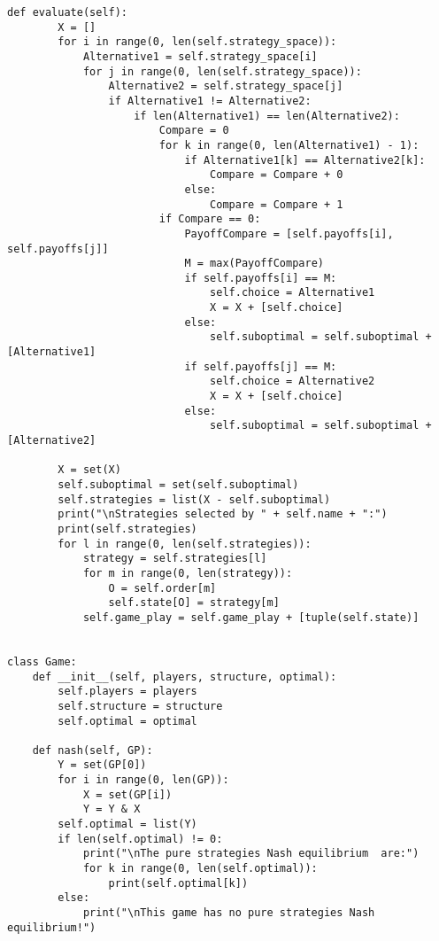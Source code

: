 \begin{itemize}
\begin{lstlisting}[style=fsharpstyle]
    def evaluate(self):
        X = []
        for i in range(0, len(self.strategy_space)):
            Alternative1 = self.strategy_space[i]
            for j in range(0, len(self.strategy_space)):
                Alternative2 = self.strategy_space[j]
                if Alternative1 != Alternative2:
                    if len(Alternative1) == len(Alternative2):
                        Compare = 0
                        for k in range(0, len(Alternative1) - 1):
                            if Alternative1[k] == Alternative2[k]:
                                Compare = Compare + 0
                            else:
                                Compare = Compare + 1
                        if Compare == 0:
                            PayoffCompare = [self.payoffs[i], self.payoffs[j]]
                            M = max(PayoffCompare)
                            if self.payoffs[i] == M:
                                self.choice = Alternative1
                                X = X + [self.choice]
                            else:
                                self.suboptimal = self.suboptimal + [Alternative1]
                            if self.payoffs[j] == M:
                                self.choice = Alternative2
                                X = X + [self.choice]
                            else:
                                self.suboptimal = self.suboptimal + [Alternative2]

        X = set(X)
        self.suboptimal = set(self.suboptimal)
        self.strategies = list(X - self.suboptimal)
        print("\nStrategies selected by " + self.name + ":")
        print(self.strategies)
        for l in range(0, len(self.strategies)):
            strategy = self.strategies[l]
            for m in range(0, len(strategy)):
                O = self.order[m]
                self.state[O] = strategy[m]
            self.game_play = self.game_play + [tuple(self.state)]


class Game:
    def __init__(self, players, structure, optimal):
        self.players = players
        self.structure = structure
        self.optimal = optimal

    def nash(self, GP):
        Y = set(GP[0])
        for i in range(0, len(GP)):
            X = set(GP[i])
            Y = Y & X
        self.optimal = list(Y)
        if len(self.optimal) != 0:
            print("\nThe pure strategies Nash equilibrium  are:")
            for k in range(0, len(self.optimal)):
                print(self.optimal[k])
        else:
            print("\nThis game has no pure strategies Nash equilibrium!")



\end{lstlisting}
\end{itemize}
